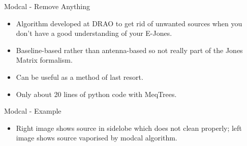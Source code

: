 \documentclass[pdf,azure,slideColor,colorBG]{prosper}
\begin{document}

\begin{slide}{Modcal - Remove Anything}
\begin{itemize}
\item Algorithm developed at DRAO to get rid of unwanted sources when you don't have a good understanding of your E-Jones.
\item Baseline-based rather than antenna-based so not really part of the Jones Matrix formalism.
\item Can be useful as a method of last resort.
\item Only about 20 lines of python code with MeqTrees.
\end{itemize}
\end{slide}

\begin{slide}{Modcal - Example}
\begin{small}
\begin{itemize}
\item Right image shows source in sidelobe which does not clean properly; left image shows source vaporised by modcal algorithm.
\end{itemize}
\end {small}
{\centering
{}
\par}
\end{slide}
\end{document}
